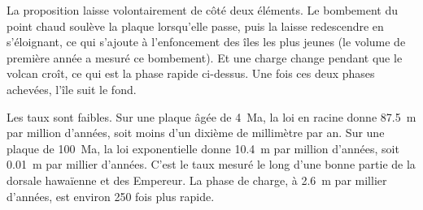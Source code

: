 La proposition laisse volontairement de côté deux éléments. Le bombement du point chaud soulève la plaque
lorsqu'elle passe, puis la laisse redescendre en s'éloignant, ce qui s'ajoute à l'enfoncement des îles
les plus jeunes (le volume de première année a mesuré ce bombement). Et une charge change pendant que le
volcan croît, ce qui est la phase rapide ci-dessus. Une fois ces deux phases achevées, l'île suit le fond.

Les taux sont faibles. Sur une plaque âgée de \qty{4}{Ma}, la loi en racine donne \qty{87.5}{m} par
million d'années, soit moins d'un dixième de millimètre par an. Sur une plaque de \qty{100}{Ma}, la
loi exponentielle donne \qty{10.4}{m} par million d'années, soit \qty{0.01}{m} par millier d'années.
C'est le taux mesuré le long d'une bonne partie de la dorsale hawaïenne et des 
Empereur. La phase de charge, à \qty{2.6}{m} par millier d'années, est environ 250 fois plus rapide.

